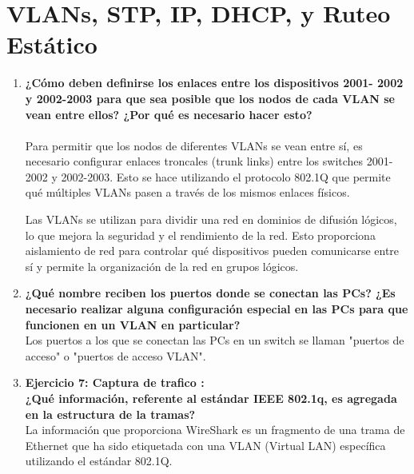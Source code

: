 \documentclass[a4paper]{article}
\begin{document}
\hfill

\section*{VLANs, STP, IP, DHCP, y Ruteo Estático
}

\begin{enumerate}

	\item \textbf{¿Cómo deben definirse los enlaces entre los dispositivos 2001-
	2002 y 2002-2003 para que sea posible que los nodos de cada
	VLAN se vean entre ellos? ¿Por qué es necesario hacer esto?}
\\
\\
Para permitir que los nodos de diferentes VLANs se vean entre sí, es necesario configurar enlaces troncales (trunk links) entre los switches 2001-2002 y 2002-2003. Esto se hace utilizando el  protocolo 802.1Q que permite qué múltiples VLANs pasen a través de los mismos enlaces físicos. 

Las VLANs se utilizan para dividir una red en dominios de difusión lógicos, lo que mejora la seguridad y el rendimiento de la red. Esto proporciona aislamiento de red para controlar qué dispositivos pueden comunicarse entre sí y permite la organización de la red en grupos lógicos.

\item \textbf{ ¿Qué nombre reciben los puertos donde se conectan las PCs?
	¿Es necesario realizar alguna configuración especial en las
	PCs para que funcionen en un VLAN en particular?}
\\
Los puertos a los que se conectan las PCs en un switch se llaman "puertos de acceso" o "puertos de acceso VLAN".

\item \textbf{ Ejercicio 7: Captura de trafico : \\¿Qué información, referente al estándar IEEE 802.1q, es agregada en la estructura de la tramas?}
\\
	La información que proporciona WireShark es un fragmento de una trama de Ethernet que ha sido etiquetada con una VLAN (Virtual LAN) específica utilizando el estándar 802.1Q. 


\end{enumerate}
\end{document}

